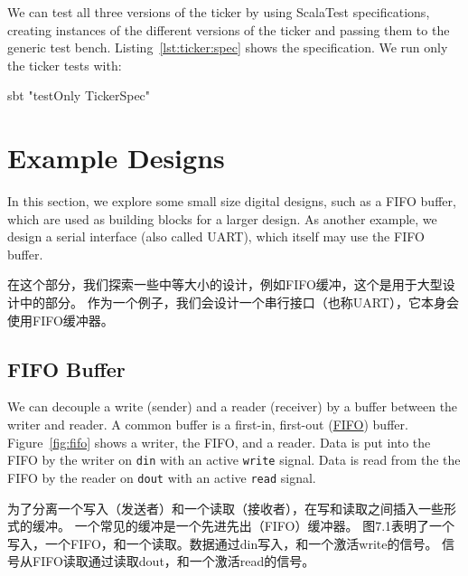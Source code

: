 \documentclass[%
    10pt,
    headinclude, footexclude,
    openright, %
    notitlepage,
    cleardoubleempty,
    headsepline,
    pointlessnumbers,
    bibtotoc, idxtotoc,
    ]{scrbook}
\newcommand{\code}[1]{{\small{\texttt{#1}}}}
\begin{document}


We can test all three versions of the ticker by using ScalaTest specifications,
creating instances of the different versions of the ticker and passing them
to the generic test bench. Listing~\ref{lst:ticker:spec} shows the specification.
We run only the ticker tests with:
\begin{chisel}
sbt "testOnly TickerSpec"
\end{chisel}





\chapter{Example Designs}

In this section, we explore some small size digital designs, such as
a FIFO buffer, which are used as building blocks for a larger design.
As another example, we design a serial interface (also called UART),
which itself may use the FIFO buffer.

在这个部分，我们探索一些中等大小的设计，例如FIFO缓冲，这个是用于大型设计中的部分。
作为一个例子，我们会设计一个串行接口（也称UART），它本身会使用FIFO缓冲器。

\section{FIFO Buffer}
\label{sec:fifo}

We can decouple a write (sender) and a reader (receiver) by a buffer
between the writer and reader.
A common buffer is a first-in, first-out
(\href{https://en.wikipedia.org/wiki/FIFO_%28computing_and_electronics%29}{FIFO})
buffer. Figure~\ref{fig:fifo} shows a writer, the FIFO, and a reader.
Data is put into the FIFO by the writer on \code{din} with an active
\code{write} signal. Data is read from the the FIFO by the reader on
\code{dout} with an active \code{read} signal.

为了分离一个写入（发送者）和一个读取（接收者），在写和读取之间插入一些形式的缓冲。
一个常见的缓冲是一个先进先出（FIFO）缓冲器。
图7.1表明了一个写入，一个FIFO，和一个读取。数据通过din写入，和一个激活write的信号。
信号从FIFO读取通过读取dout，和一个激活read的信号。
\end{document}

